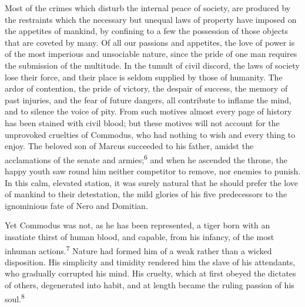 Most of the crimes which disturb the internal peace of society,
are produced by the restraints which the necessary but unequal
laws of property have imposed on the appetites of mankind, by
confining to a few the possession of those objects that are
coveted by many. Of all our passions and appetites, the love of
power is of the most imperious and unsociable nature, since the
pride of one man requires the submission of the multitude. In the
tumult of civil discord, the laws of society lose their force,
and their place is seldom supplied by those of humanity. The
ardor of contention, the pride of victory, the despair of
success, the memory of past injuries, and the fear of future
dangers, all contribute to inflame the mind, and to silence the
voice of pity. From such motives almost every page of history has
been stained with civil blood; but these motives will not account
for the unprovoked cruelties of Commodus, who had nothing to wish
and every thing to enjoy. The beloved son of Marcus succeeded to
his father, amidst the acclamations of the senate and armies;\textsuperscript{6}
and when he ascended the throne, the happy youth saw round him
neither competitor to remove, nor enemies to punish. In this
calm, elevated station, it was surely natural that he should
prefer the love of mankind to their detestation, the mild glories
of his five predecessors to the ignominious fate of Nero and
Domitian.


Yet Commodus was not, as he has been represented, a tiger born
with an insatiate thirst of human blood, and capable, from his
infancy, of the most inhuman actions.\textsuperscript{7} Nature had formed him of
a weak rather than a wicked disposition. His simplicity and
timidity rendered him the slave of his attendants, who gradually
corrupted his mind. His cruelty, which at first obeyed the
dictates of others, degenerated into habit, and at length became
the ruling passion of his soul.\textsuperscript{8}



